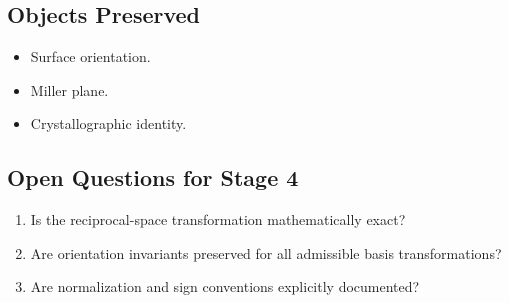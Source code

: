 \subsection{Objects Preserved}

\begin{itemize}
\item Surface orientation.
\item Miller plane.
\item Crystallographic identity.
\end{itemize}

\subsection{Open Questions for Stage 4}

\begin{enumerate}
\item Is the reciprocal-space transformation mathematically exact?
\item Are orientation invariants preserved for all admissible basis
transformations?
\item Are normalization and sign conventions explicitly documented?
\end{enumerate}
